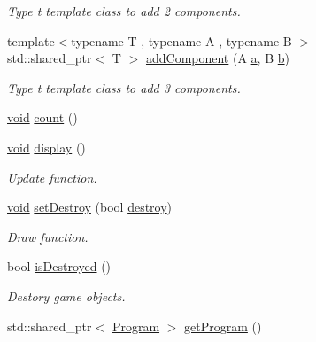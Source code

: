 \begin{DoxyCompactItemize}
\begin{DoxyCompactList}\small\item\em Type t template class to add 2 components. \end{DoxyCompactList}\item 
{\footnotesize template$<$typename T , typename A , typename B $>$ }\\std\+::shared\+\_\+ptr$<$ T $>$ \mbox{\hyperlink{class_aspect_1_1_engine_1_1_entity_a73a023e500fddd340cf843e6e11796dd}{add\+Component}} (A \mbox{\hyperlink{_s_d_l__opengl__glext_8h_a3309789fc188587d666cda5ece79cf82}{a}}, B \mbox{\hyperlink{_s_d_l__opengl__glext_8h_a0f71581a41fd2264c8944126dabbd010}{b}})
\begin{DoxyCompactList}\small\item\em Type t template class to add 3 components. \end{DoxyCompactList}\item 
\mbox{\hyperlink{_s_d_l__opengles2__gl2ext_8h_ae5d8fa23ad07c48bb609509eae494c95}{void}} \mbox{\hyperlink{class_aspect_1_1_engine_1_1_entity_ad3a033d6bbe1dfa9011e4f2d5ce8c928}{count}} ()
\item 
\mbox{\hyperlink{_s_d_l__opengles2__gl2ext_8h_ae5d8fa23ad07c48bb609509eae494c95}{void}} \mbox{\hyperlink{class_aspect_1_1_engine_1_1_entity_ac889f58ccf361ce3ec1126f9df141679}{display}} ()
\begin{DoxyCompactList}\small\item\em Update function. \end{DoxyCompactList}\item 
\mbox{\hyperlink{_s_d_l__opengles2__gl2ext_8h_ae5d8fa23ad07c48bb609509eae494c95}{void}} \mbox{\hyperlink{class_aspect_1_1_engine_1_1_entity_a9e6f9d5884b67082bcafc76b6cfacd79}{set\+Destroy}} (bool \mbox{\hyperlink{class_aspect_1_1_engine_1_1_entity_a425294ababc4132392204443f47cb36a}{destroy}})
\begin{DoxyCompactList}\small\item\em Draw function. \end{DoxyCompactList}\item 
bool \mbox{\hyperlink{class_aspect_1_1_engine_1_1_entity_a62a6db91aaf6b188d57edeb2bfa24767}{is\+Destroyed}} ()
\begin{DoxyCompactList}\small\item\em Destory game objects. \end{DoxyCompactList}\item 
std\+::shared\+\_\+ptr$<$ \mbox{\hyperlink{class_aspect_1_1_engine_1_1_program}{Program}} $>$ \mbox{\hyperlink{class_aspect_1_1_engine_1_1_entity_a39566f856dd82efb948383c3037290a0}{get\+Program}} ()
\end{DoxyCompactItemize}
